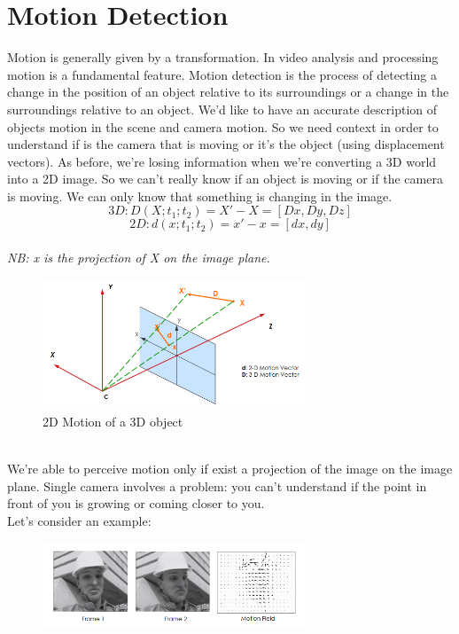 \chapter{Motion Detection}
Motion is generally given by a transformation. In video analysis and processing motion is a fundamental feature. 
Motion detection is the process of detecting a change in the position of an object relative to its surroundings or a change in the surroundings relative to an object. We'd like to have an accurate description of objects motion in the scene and camera motion. So we need context in order to understand if is the camera that is moving or it's the object (using displacement vectors).
As before, we're losing information when we're converting a 3D world into a 2D image. So we can't really know if an object is moving or if the camera is moving. We can only know that something is changing in the image.
\\
\[3D: D(X; t_1; t_2) = X' - X = [Dx, Dy, Dz]\]
\[2D: d(x; t_1; t_2) = x' - x = [dx, dy]\]
\\ \textit{NB: x is the projection of X on the image plane.}
\begin{figure}[h]
    \centering
    \includegraphics[width=0.7\textwidth]{Figures/2DMotion.png}
    \caption{2D Motion of a 3D object}
\end{figure}
\\We're able to perceive motion only if exist a projection of the image on the image plane. Single camera involves a problem: you can't understand if the point in front of you is growing or coming closer to you.
\\Let's consider an example: 
\begin{figure}[h]
    \centering
    \includegraphics[width=0.7\textwidth]{Figures/Example.png}
\end{figure}
